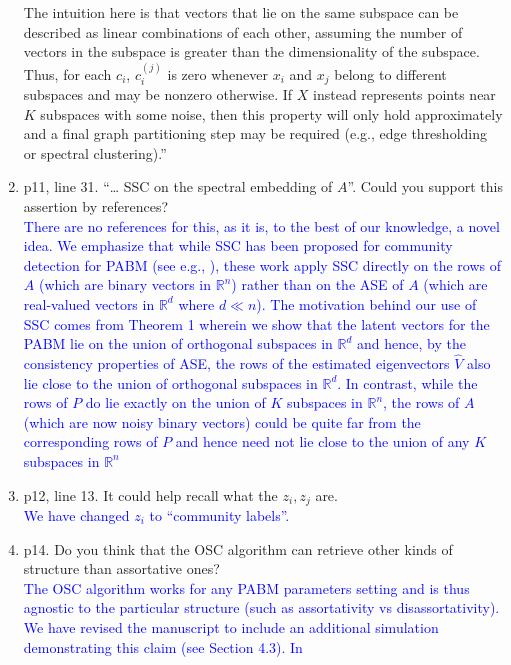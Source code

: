 \documentclass[
]{article}
\begin{document}
\begin{enumerate}
{  The intuition here is that vectors that lie on the same subspace can
  be described as linear combinations of each other, assuming the number
  of vectors in the subspace is greater than the dimensionality of the
  subspace. Thus, for each $c_i$, $c_i^{(j)}$ is zero whenever $x_i$ and $x_j$ belong to different subspaces and may be nonzero otherwise. If \(X\) instead represents points near \(K\) subspaces with some noise, 
  then this property will only hold approximately and 
  a final graph partitioning step may be required 
  (e.g., edge thresholding or spectral clustering).''
  }
\item
  p11, line 31. ``\ldots{} SSC on the spectral embedding of \(A\)''.
  Could you support this assertion by references?\\
  \textcolor{blue}{
  There are no references for this, as it is, to the best of our knowledge, a novel idea. 
  We emphasize that while SSC has been proposed for community detection
  for PABM (see e.g., \citep{noroozi2019estimation}), these work apply SSC
  directly on the rows of $A$ (which are binary vectors in
  $\mathbb{R}^{n}$) rather than on the ASE of $A$ (which are real-valued
  vectors in $\mathbb{R}^{d}$ where $d \ll n$). The motivation behind
  our use of SSC comes  from Theorem 1 wherein we show that the latent
  vectors for the PABM lie on the union of orthogonal subspaces in $\mathbb{R}^{d}$ and hence,
  by the consistency properties of ASE, the rows of the estimated
  eigenvectors $\hat{V}$ also lie close to the union of orthogonal
  subspaces in $\mathbb{R}^{d}$. In contrast, while the rows of $P$ do lie exactly on the
  union of $K$ subspaces in $\mathbb{R}^{n}$, the rows of $A$
  (which are now noisy binary vectors) could be quite far from the
  corresponding rows of $P$ and hence need not lie close to the union
  of any $K$ subspaces in $\mathbb{R}^{n}$ 
  }
\item
  p12, line 13. It could help recall what the \(z_i, z_j\) are.\\
  \textcolor{blue}{
  We have changed $z_i$ to ``community labels''.
  }
\item
  p14. Do you think that the OSC algorithm can retrieve other kinds of
  structure than assortative ones?\\
  \textcolor{blue}{
  The OSC algorithm works for any PABM parameters setting and is thus
  agnostic to the particular structure (such as assortativity vs
  disassortativity). We have revised the manuscript to include an
  additional simulation demonstrating this claim (see Section 4.3). In
}
\end{enumerate}
\end{document}
